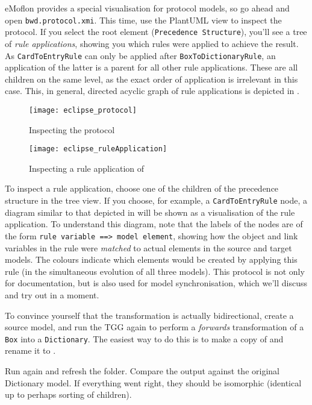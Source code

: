 \begin{stepbystep}
\item eMoflon provides a special visualisation for protocol models, so go ahead and open \texttt{bwd.protocol.xmi}.
This time, use the PlantUML view to inspect the protocol.
If you select the root element (\texttt{Precedence Structure}), you'll see a tree of \emph{rule applications}, showing you which rules were applied to achieve the result.
As \texttt{Card\-To\-Entry\-Rule} can only be applied after \texttt{BoxToDictionaryRule}, an application of the latter is a parent for all other rule applications.
These are all children on the same level, as the exact order of application is irrelevant in this case.
This, in general, directed acyclic graph of rule applications is depicted in .
 
\begin{figure}[htb]
\begin{center}
  \texttt{[image: eclipse\_protocol]}
  \caption{Inspecting the protocol}
  \label{eclipse_protocol}
\end{center}
\end{figure}

\begin{figure}[htb]
\begin{center}
  \texttt{[image: eclipse\_ruleApplication]}
  \caption{Inspecting a rule application of }
  \label{eclipse_ruleApplication}
\end{center}
\end{figure}

\item To inspect a rule application, choose one of the children of the precedence structure in the tree view.
If you choose, for example, a \texttt{Card\-To\-Entry\-Rule} node, a diagram similar to that depicted in  will be shown as a visualisation of the rule application.
To understand this diagram, note that the labels of the nodes are of the form \texttt{rule variable ==> model element}, showing how the object and link variables in the rule were \emph{matched} to actual elements in the source and target models.
The colours indicate which elements would be created by applying this rule (in the simultaneous evolution of all three models).
This protocol is not only for documentation, but is also used for model synchronisation, which we'll discuss and try out in a moment.

\item To convince yourself that the transformation is actually bidirectional, create a source model, and run the TGG again to perform a \emph{forwards} transformation of a \texttt{Box} into a \texttt{Dictionary}.
The easiest way to do this is to make a copy of  and rename
it to .

\item Run  again and refresh the  folder. 
Compare the output  against the original  Dictionary model. 
If everything went right, they should be isomorphic (identical up to perhaps sorting of children).
\end{stepbystep}

